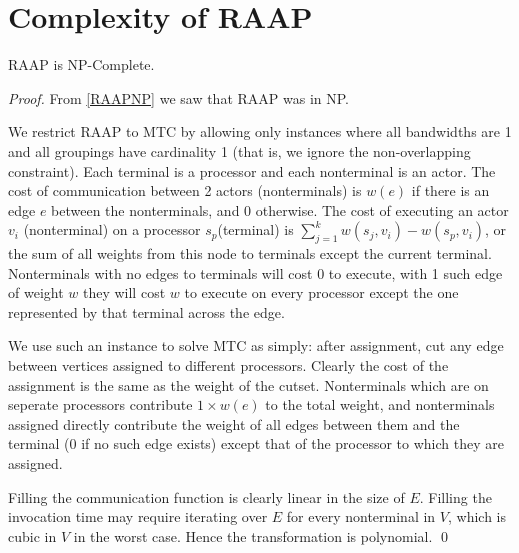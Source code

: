 \documentclass{article}
\begin{document}
\section{Complexity of RAAP}

\begin{theorem}
\label{RAAPNPC}
RAAP is NP-Complete.
\end{theorem}

\begin{proof}
From \ref{RAAPNP} we saw that RAAP was in NP.

We restrict RAAP to MTC by allowing only instances where all bandwidths are 1 and all groupings have cardinality 1 (that is, we ignore the non-overlapping constraint).
Each terminal is a processor and each nonterminal is an actor.
The cost of communication between 2 actors (nonterminals) is $w(e)$ if there is an edge $e$ between the nonterminals, and 0 otherwise.
The cost of executing an actor $v_i$ (nonterminal) on a processor $s_p$(terminal) is $\sum_{j=1}^{k}{w(s_j,v_i)} - w(s_p, v_i)$, or the sum of all weights from this node to terminals except the current terminal.
Nonterminals with no edges to terminals will cost 0 to execute, with 1 such edge of weight $w$ they will cost $w$ to execute on every processor except the one represented by that terminal across the edge.

We use such an instance to solve MTC as simply: after assignment, cut any edge between vertices assigned to different processors.
Clearly the cost of the assignment is the same as the weight of the cutset.
Nonterminals which are on seperate processors contribute $1 \times w(e)$ to the total weight, and nonterminals assigned directly contribute the weight of all edges between them and the terminal (0 if no such edge exists) except that of the processor to which they are assigned.

Filling the communication function is clearly linear in the size of $E$.
Filling the invocation time may require iterating over $E$ for every nonterminal in $V$, which is cubic in $V$ in the worst case.
Hence the transformation is polynomial.
\qed
\end{proof}



\end{document}
